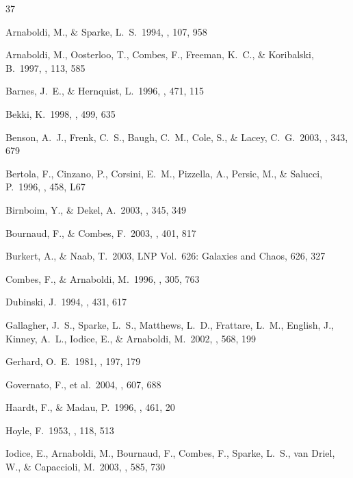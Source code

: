 \documentclass[preprint]{aastex}
\begin{document}
\begin{thebibliography}{37}

 Arnaboldi, M., \& 
Sparke, L.~S.\ 1994, \aj, 107, 958 

 Arnaboldi, M., 
Oosterloo, T., Combes, F., Freeman, K.~C., \& Koribalski, B.\ 1997, \aj, 
113, 585 

 Barnes, J.~E., \& 
Hernquist, L.\ 1996, \apj, 471, 115 
 
 Bekki, K.\ 1998, \apj, 499, 635 

 Benson, A.~J., Frenk, 
C.~S., Baugh, C.~M., Cole, S., \& Lacey, C.~G.\ 2003, \mnras, 343, 679 

 Bertola, F., Cinzano, 
P., Corsini, E.~M., Pizzella, A., Persic, M., \& Salucci, P.\ 1996, \apjl, 
458, L67 

 Birnboim, Y., \& 
Dekel, A.\ 2003, \mnras, 345, 349 
 
 Bournaud, F., \& 
Combes, F.\ 2003, \aap, 401, 817 

 Burkert, A., \& Naab, 
T.\ 2003, LNP Vol.~626: Galaxies and Chaos, 626, 327 

 Combes, F., \& 
Arnaboldi, M.\ 1996, \aap, 305, 763 
  
 Dubinski, J.\ 1994, \apj, 
431, 617 

 Gallagher, J.~S., 
Sparke, L.~S., Matthews, L.~D., Frattare, L.~M., English, J., Kinney, 
A.~L., Iodice, E., \& Arnaboldi, M.\ 2002, \apj, 568, 199 

 Gerhard, O.~E.\ 1981, \mnras, 
197, 179 

 Governato, F., et 
al.\ 2004, \apj, 607, 688 

 Haardt, F., \& Madau, 
P.\ 1996, \apj, 461, 20 

 Hoyle, F.\ 1953, \apj, 118, 513 

 Iodice, E., Arnaboldi, 
M., Bournaud, F., Combes, F., Sparke, L.~S., van Driel, W., \& Capaccioli, 
M.\ 2003, \apj, 585, 730 


\end{thebibliography}
\end{document}
